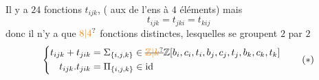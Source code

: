 Il y a $24$ fonctions $t_{ijk}$,  ( aux  de l'ens à $4$ éléments) mais
\[
 t_{ijk}=t_{jki}=t_{kij}
\]
donc il n'y a que $\unsure{8|4}$ fonctions distinctes, lesquelles se groupent $2$ par $2$ 
\[
 \left\{\begin{aligned}
 t_{ijk}+t_{jik}&=\Sigma_{\{i,j,k\}}\in\deleted{\unsure{\mathbb Z|k}}\mathbb Z[b_i,c_i,t_i,b_j,c_j,t_j,b_k,c_k,t_k]\\
 t_{ijk}.t_{jik}&=\Pi_{\{i,j,k\}}\in\text{id}
 \end{aligned}\right.\tag*{$(*)$}
\]
